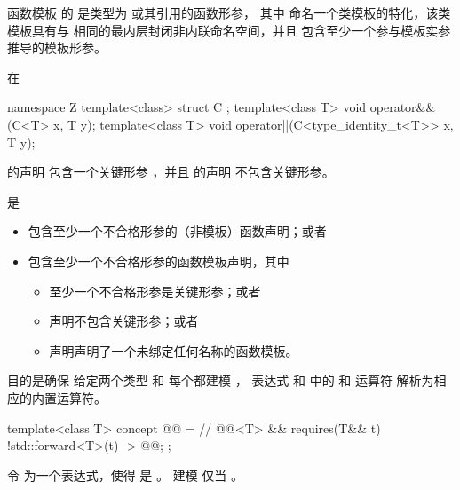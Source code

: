 \pnum
{}%
函数模板  的 
是类型为 \cv{}  或其引用的函数形参，
其中  命名一个类模板的特化，该类模板具有与  相同的最内层封闭非内联命名空间，并且
 包含至少一个参与模板实参推导的模板形参。
\begin{example}
在
\begin{codeblock}
namespace Z {
template<class> struct C {};
template<class T>
  void operator&&(C<T> x, T y);
template<class T>
  void operator||(C<type_identity_t<T>> x, T y);
}
\end{codeblock}
 的声明
包含一个关键形参 ，并且
 的声明
不包含关键形参。
\end{example}

\pnum
{} 是

\begin{itemize}
\item
包含至少一个不合格形参的（非模板）函数声明；或者

\item
包含至少一个不合格形参的函数模板声明，其中
\begin{itemize}
\item 至少一个不合格形参是关键形参；或者
\item 声明不包含关键形参；或者
\item 声明声明了一个未绑定任何名称的函数模板。
\end{itemize}
\end{itemize}

\pnum
\begin{note}
目的是确保
给定两个类型  和 
每个都建模 ，
表达式  和
 中的 \tcode{\&\&} 和 \tcode{||} 运算符
解析为相应的内置运算符。
\end{note}

\begin{itemdecl}
template<class T>
concept @@ =                // \expos
  @@<T> && requires(T&& t) {
    { !std::forward<T>(t) } -> @@;
  };
\end{itemdecl}

\pnum
令  为一个表达式，使得
 是 。
 建模  仅当
。

